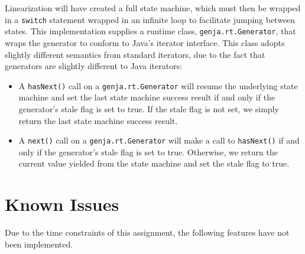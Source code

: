 \documentclass[journal,a4paper]{IEEEtran}
\begin{document}
Linearization will have created a full state machine, which must then be wrapped in a
\texttt{switch} statement wrapped in an infinite loop to facilitate jumping between states. This
implementation supplies a runtime class, \texttt{genja.rt.Generator}, that wraps the generator to
conform to Java's iterator interface. This class adopts slightly different semantics from standard
iterators, due to the fact that generators are slightly different to Java iterators:

\begin{itemize}
\item A \texttt{hasNext()} call on a \texttt{genja.rt.Generator} will resume the underlying state
machine and set the last state machine success result if and only if the generator's stale flag is
set to true. If the stale flag is not set, we simply return the last state machine success result.

\item A \texttt{next()} call on a \texttt{genja.rt.Generator} will make a call to
\texttt{hasNext()} if and only if the generator's stale flag is set to true. Otherwise, we return
the current value yielded from the state machine and set the stale flag to true.
\end{itemize}

\section{Known Issues}

Due to the time constraints of this assignment, the following features have not been implemented.
\end{document}
